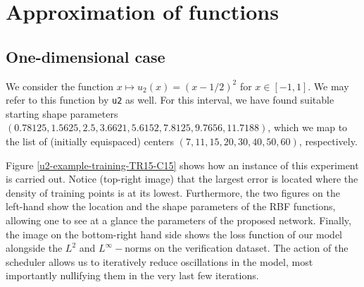 \documentclass[12pt]{report} %
\begin{document}
\section{Approximation of functions}\label{sec:preliminary-problem-1}

\subsection*{One-dimensional case}

We consider the function $x \mapsto u_2(x)=(x-1/2)^2$ for $x \in [-1,1]$. We may refer to this function by \texttt{u2} as well. For this interval, we have found suitable starting shape parameters $(0.78125, 1.5625, 2.5, 3.6621, 5.6152, 7.8125,9.7656,11.7188)$, which we map to the list of (initially equispaced) centers $(7,11,15,20,30,40,50,60)$, respectively.

Figure \ref{u2-example-training-TR15-C15} shows how an instance of this experiment is carried out. Notice (top-right image) that the largest error is located where the density of training points is at its lowest. Furthermore, the two figures on the left-hand show the location and the shape parameters of the RBF functions, allowing one to see at a glance the parameters of the proposed network. Finally, the image on the bottom-right hand side shows the loss function of our model alongside the $L^2$ and $L^\infty-$norms on the verification dataset. The action of the scheduler allows us to iteratively reduce oscillations in the model, most importantly nullifying them in the very last few iterations.
\end{document}
